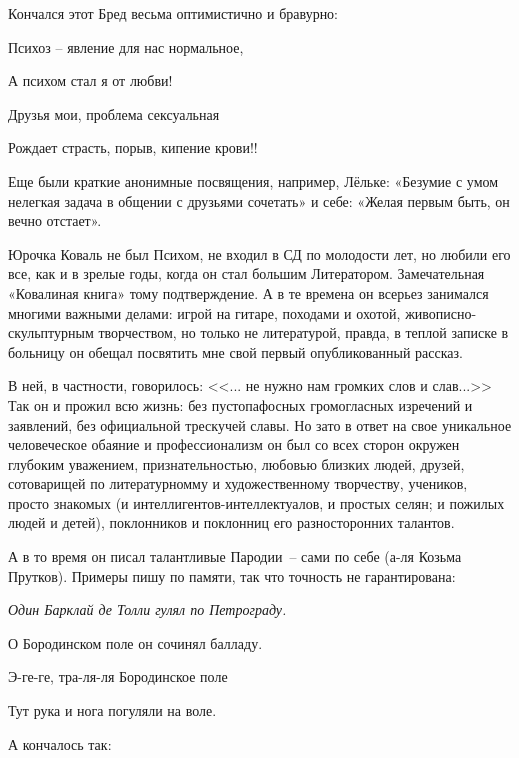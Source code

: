 Кончался этот Бред весьма оптимистично и бравурно:

{\itshape

\indent

	Психоз – явление для нас нормальное,
	
	А психом стал я от любви!
	
	Друзья мои, проблема сексуальная
	
	Рождает страсть, порыв, кипение крови!!

}

\indent

	Еще были краткие анонимные посвящения, например, Лёльке: «Безумие с умом нелегкая задача в общении с друзьями сочетать» и себе: «Желая первым быть, он вечно отстает».


Юрочка Коваль  не был Психом, не входил в СД по молодости лет, но любили его все, как и в зрелые годы, когда он стал большим Литератором. Замечательная «Ковалиная книга» тому подтверждение. А в те времена он всерьез занимался многими важными делами: игрой на гитаре, походами и охотой, живописно-скульптурным творчеством, но только не литературой, правда, в теплой записке в больницу он обещал посвятить мне свой первый опубликованный рассказ. 

В ней, в частности, говорилось: <<... не нужно нам громких слов и слав...>> Так он и прожил всю жизнь: без пустопафосных громогласных изречений и заявлений, без официальной трескучей славы. Но зато в ответ на свое уникальное человеческое обаяние и профессионализм он был со всех сторон окружен глубоким уважением, признательностью, любовью близких людей, друзей, сотоварищей по литературномму и художественному творчеству, учеников, просто знакомых (и интеллигентов-интеллектуалов, и простых селян; и пожилых людей и детей), поклонников и поклонниц его разносторонних талантов.

А в то время он писал талантливые Пародии~-- сами по себе (а-ля Козьма Прутков). Примеры пишу по памяти, так что точность не гарантирована:

\indent

{\itshape
	Один Барклай де Толли гулял по Петрограду.
	
    О Бородинском поле он сочинял балладу.
    
    Э-ге-ге, тра-ля-ля Бородинское поле
    
    Тут рука и нога погуляли на воле.

}

\indent

\noindent
А кончалось так:

